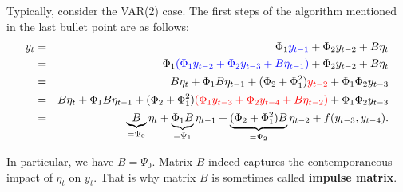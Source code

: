 \documentclass[
  11pt,
]{book}
\theoremstyle{definition}
\theoremstyle{definition}
\theoremstyle{definition}
\theoremstyle{definition}
\theoremstyle{remark}
\begin{document}
Typically, consider the VAR(2) case. The first steps of the algorithm mentioned in the last bullet point are as follows:
\begin{eqnarray*}
y_t &=& \Phi_1 {\color{blue}y_{t-1}} + \Phi_2 y_{t-2} + B \eta_t  \\
&=& \Phi_1 {\color{blue}(\Phi_1 y_{t-2} + \Phi_2 y_{t-3} + B \eta_{t-1})} + \Phi_2 y_{t-2} + B \eta_t  \\
&=& B \eta_t + \Phi_1 B \eta_{t-1} + (\Phi_2 + \Phi_1^2) {\color{red}y_{t-2}} + \Phi_1\Phi_2 y_{t-3}  \\
&=& B \eta_t + \Phi_1 B \eta_{t-1} + (\Phi_2 + \Phi_1^2) {\color{red}(\Phi_1 y_{t-3} + \Phi_2 y_{t-4} + B \eta_{t-2})} + \Phi_1\Phi_2 y_{t-3} \\
&=& \underbrace{B}_{=\Psi_0} \eta_t + \underbrace{\Phi_1 B}_{=\Psi_1} \eta_{t-1} + \underbrace{(\Phi_2 + \Phi_1^2)B}_{=\Psi_2} \eta_{t-2} + f(y_{t-3},y_{t-4}).
\end{eqnarray*}

In particular, we have \(B = \Psi_0\). Matrix \(B\) indeed captures the contemporaneous impact of \(\eta_t\) on \(y_t\). That is why matrix \(B\) is sometimes called \textbf{impulse matrix}.
\end{document}
